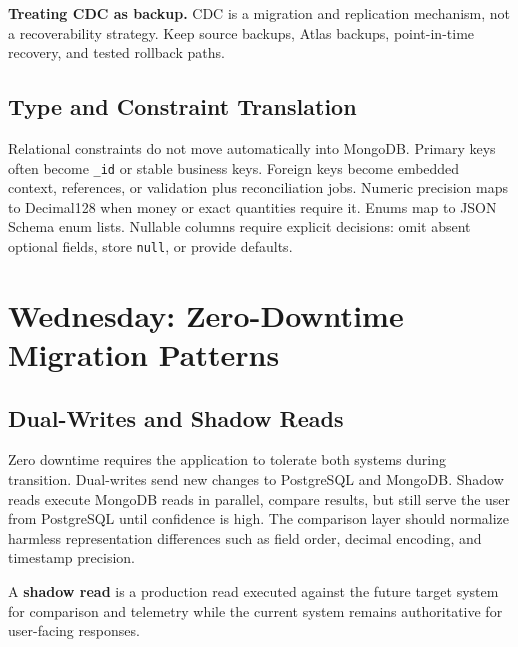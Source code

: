 \begin{pitfall}
\textbf{Treating CDC as backup.} CDC is a migration and replication mechanism, not a recoverability strategy. Keep source backups, Atlas backups, point-in-time recovery, and tested rollback paths.
\end{pitfall}

\subsection{Type and Constraint Translation}
Relational constraints do not move automatically into MongoDB. Primary keys often become \texttt{\_id} or stable business keys. Foreign keys become embedded context, references, or validation plus reconciliation jobs. Numeric precision maps to Decimal128 when money or exact quantities require it. Enums map to JSON Schema enum lists. Nullable columns require explicit decisions: omit absent optional fields, store \texttt{null}, or provide defaults.

\section{Wednesday: Zero-Downtime Migration Patterns}
\subsection{Dual-Writes and Shadow Reads}
Zero downtime requires the application to tolerate both systems during transition. Dual-writes send new changes to PostgreSQL and MongoDB. Shadow reads execute MongoDB reads in parallel, compare results, but still serve the user from PostgreSQL until confidence is high. The comparison layer should normalize harmless representation differences such as field order, decimal encoding, and timestamp precision.

\begin{definitionbox}
A \textbf{shadow read} is a production read executed against the future target system for comparison and telemetry while the current system remains authoritative for user-facing responses.
\end{definitionbox}

